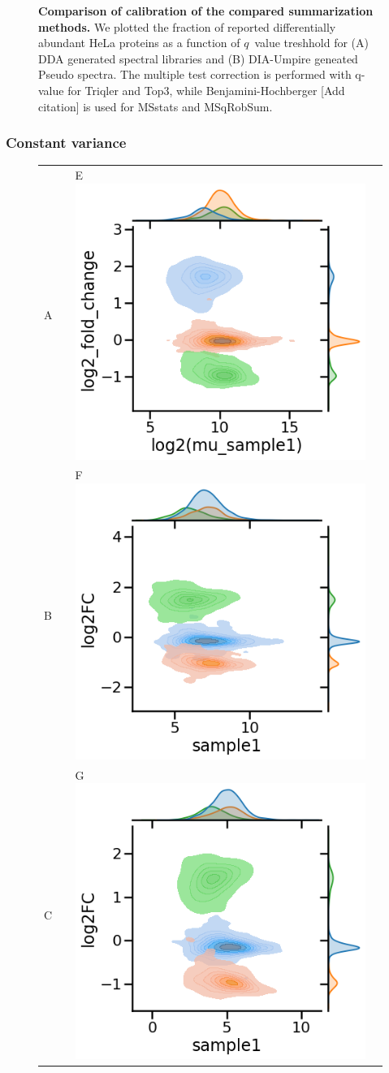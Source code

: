 \documentclass[10pt,letterpaper]{article}
\begin{document}
\begin{figure}[hbt]
\begin{tabular}{lclc}
    \end{tabular}
  \caption{{\bf Comparison of calibration of the compared summarization methods.} We plotted the fraction of reported differentially abundant HeLa proteins as a function of $q$~value treshhold for (A) DDA generated spectral libraries and (B) DIA-Umpire geneated Pseudo spectra. The multiple test correction is performed with q-value for Triqler and Top3, while Benjamini-Hochberger [Add citation] is used for MSstats and MSqRobSum. \label{fig:frac_hela_vs_fdr}}
\end{figure}


\iffalse
\subsubsection*{Constant variance}

\begin{figure}[hbt]
    \centering
    \begin{tabular}{lclc} 
        A  & &%
        E \includegraphics[width=0.35\linewidth]{../../result/report_plots/diann_scatter_triqler.png} & \\%
        B  & &%
        F \includegraphics[width=0.35\linewidth]{../../result/report_plots/diann_scatter_msqrobsum.png} & \\%
        C  & &%
        G \includegraphics[width=0.35\linewidth]{../../result/report_plots/diann_scatter_msstats.png} & \\%

\end{tabular}
\end{figure}
\end{document}
